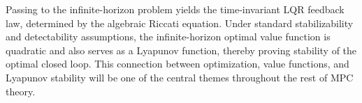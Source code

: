 Passing to the infinite-horizon problem yields the time-invariant LQR feedback law, determined by the algebraic Riccati equation. Under standard stabilizability and detectability assumptions, the infinite-horizon optimal value function is quadratic and also serves as a Lyapunov function, thereby proving stability of the optimal closed loop. This connection between optimization, value functions, and Lyapunov stability will be one of the central themes throughout the rest of MPC theory.